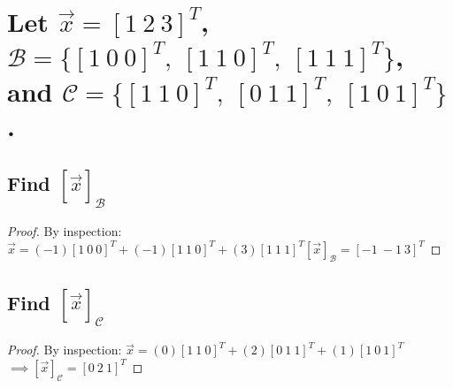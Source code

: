 \documentclass[../main.tex]{subfiles}
\begin{document}
\section{Let $\vec{x} = [1 \ 2 \ 3]^T$, $\mathcal{B} = \{[1 \ 0 \ 0]^T, \  [1 \ 1 \ 0]^T, \ [1 \ 1 \ 1]^T \}$, and $\mathcal{C} = \{[1 \ 1 \ 0]^T, \  [0 \ 1 \ 1]^T, \ [1 \ 0 \ 1]^T \}$.}
\subsection{Find $[\vec{x}]_{\mathcal{B}}$}
        \begin{proof} By inspection: $\vec{x} = (-1)[1 \ 0 \ 0]^T + (-1)[1 \ 1 \ 0]^T + (3)[1 \ 1 \ 1]^T [\vec{x}]_{\mathcal{B}} =  [-1 \ -1 \ 3]^T $
        \end{proof}
        \subsection{Find $[\vec{x}]_{\mathcal{C}}$}
\begin{proof}
        By inspection: $\vec{x} =(0)[1 \ 1 \ 0]^T + (2)[0 \ 1 \ 1]^T + (1)[1 \ 0 \ 1]^T$
        $\implies [\vec{x}]_{\mathcal{C}} = [0 \ 2 \ 1]^T$
\end{proof}
\end{document}
